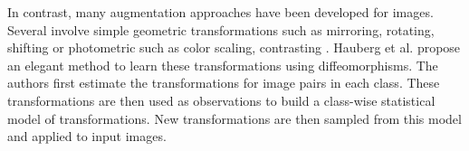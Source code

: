 In contrast, many augmentation approaches have been developed for images. Several involve simple geometric
transformations such as mirroring, rotating, shifting \cite{Gu2018} or photometric such as color scaling, contrasting
\cite{Eigen2015}. Hauberg et al. \cite{Hauberg2016Diffeomorphism} propose an elegant method to learn these
transformations using diffeomorphisms. The authors first estimate the transformations for image pairs in each class.
These transformations are then used as observations to build a class-wise statistical model of transformations.
New transformations are then sampled from this model and applied to input images.

